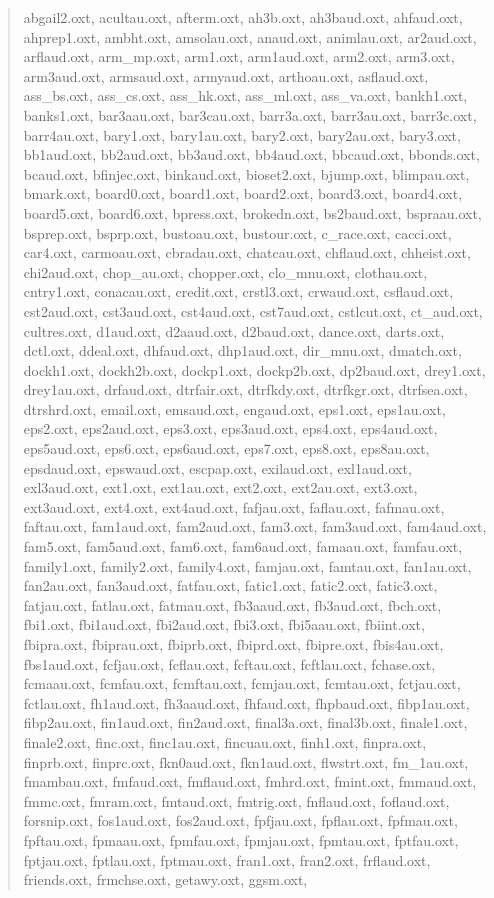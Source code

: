 \documentclass[]{scrartcl}
\begin{document}
\begin{quote}
   \ttfamily
   abgail2.oxt, acultau.oxt, afterm.oxt, ah3b.oxt, ah3baud.oxt, ahfaud.oxt, ahprep1.oxt, ambht.oxt, amsolau.oxt, anaud.oxt, animlau.oxt, ar2aud.oxt, arflaud.oxt, arm\_mp.oxt, arm1.oxt, arm1aud.oxt, arm2.oxt, arm3.oxt, arm3aud.oxt, armsaud.oxt, armyaud.oxt, arthoau.oxt, asflaud.oxt, ass\_bs.oxt, ass\_cs.oxt, ass\_hk.oxt, ass\_ml.oxt, ass\_va.oxt, bankh1.oxt, banks1.oxt, bar3aau.oxt, bar3cau.oxt, barr3a.oxt, barr3au.oxt, barr3c.oxt, barr4au.oxt, bary1.oxt, bary1au.oxt, bary2.oxt, bary2au.oxt, bary3.oxt, bb1aud.oxt, bb2aud.oxt, bb3aud.oxt, bb4aud.oxt, bbcaud.oxt, bbonds.oxt, bcaud.oxt, bfinjec.oxt, binkaud.oxt, bioset2.oxt, bjump.oxt, blimpau.oxt, bmark.oxt, board0.oxt, board1.oxt, board2.oxt, board3.oxt, board4.oxt, board5.oxt, board6.oxt, bpress.oxt, brokedn.oxt, bs2baud.oxt, bspraau.oxt, bsprep.oxt, bsprp.oxt, bustoau.oxt, bustour.oxt, c\_race.oxt, cacci.oxt, car4.oxt, carmoau.oxt, cbradau.oxt, chatcau.oxt, chflaud.oxt, chheist.oxt, chi2aud.oxt, chop\_au.oxt, chopper.oxt, clo\_mnu.oxt, clothau.oxt, cntry1.oxt, conacau.oxt, credit.oxt, crstl3.oxt, crwaud.oxt, csflaud.oxt, cst2aud.oxt, cst3aud.oxt, cst4aud.oxt, cst7aud.oxt, cstlcut.oxt, ct\_aud.oxt, cultres.oxt, d1aud.oxt, d2aaud.oxt, d2baud.oxt, dance.oxt, darts.oxt, dctl.oxt, ddeal.oxt, dhfaud.oxt, dhp1aud.oxt, dir\_mnu.oxt, dmatch.oxt, dockh1.oxt, dockh2b.oxt, dockp1.oxt, dockp2b.oxt, dp2baud.oxt, drey1.oxt, drey1au.oxt, drfaud.oxt, dtrfair.oxt, dtrfkdy.oxt, dtrfkgr.oxt, dtrfsea.oxt, dtrshrd.oxt, email.oxt, emsaud.oxt, engaud.oxt, eps1.oxt, eps1au.oxt, eps2.oxt, eps2aud.oxt, eps3.oxt, eps3aud.oxt, eps4.oxt, eps4aud.oxt, eps5aud.oxt, eps6.oxt, eps6aud.oxt, eps7.oxt, eps8.oxt, eps8au.oxt, epsdaud.oxt, epswaud.oxt, escpap.oxt, exilaud.oxt, exl1aud.oxt, exl3aud.oxt, ext1.oxt, ext1au.oxt, ext2.oxt, ext2au.oxt, ext3.oxt, ext3aud.oxt, ext4.oxt, ext4aud.oxt, fafjau.oxt, faflau.oxt, fafmau.oxt, faftau.oxt, fam1aud.oxt, fam2aud.oxt, fam3.oxt, fam3aud.oxt, fam4aud.oxt, fam5.oxt, fam5aud.oxt, fam6.oxt, fam6aud.oxt, famaau.oxt, famfau.oxt, family1.oxt, family2.oxt, family4.oxt, famjau.oxt, famtau.oxt, fan1au.oxt, fan2au.oxt, fan3aud.oxt, fatfau.oxt, fatic1.oxt, fatic2.oxt, fatic3.oxt, fatjau.oxt, fatlau.oxt, fatmau.oxt, fb3aaud.oxt, fb3aud.oxt, fbch.oxt, fbi1.oxt, fbi1aud.oxt, fbi2aud.oxt, fbi3.oxt, fbi5aau.oxt, fbiint.oxt, fbipra.oxt, fbiprau.oxt, fbiprb.oxt, fbiprd.oxt, fbipre.oxt, fbis4au.oxt, fbs1aud.oxt, fcfjau.oxt, fcflau.oxt, fcftau.oxt, fcftlau.oxt, fchase.oxt, fcmaau.oxt, fcmfau.oxt, fcmftau.oxt, fcmjau.oxt, fcmtau.oxt, fctjau.oxt, fctlau.oxt, fh1aud.oxt, fh3aaud.oxt, fhfaud.oxt, fhpbaud.oxt, fibp1au.oxt, fibp2au.oxt, fin1aud.oxt, fin2aud.oxt, final3a.oxt, final3b.oxt, finale1.oxt, finale2.oxt, finc.oxt, finc1au.oxt, fincuau.oxt, finh1.oxt, finpra.oxt, finprb.oxt, finprc.oxt, fkn0aud.oxt, fkn1aud.oxt, flwstrt.oxt, fm\_1au.oxt, fmambau.oxt, fmfaud.oxt, fmflaud.oxt, fmhrd.oxt, fmint.oxt, fmmaud.oxt, fmmc.oxt, fmram.oxt, fmtaud.oxt, fmtrig.oxt, fnflaud.oxt, foflaud.oxt, forsnip.oxt, fos1aud.oxt, fos2aud.oxt, fpfjau.oxt, fpflau.oxt, fpfmau.oxt, fpftau.oxt, fpmaau.oxt, fpmfau.oxt, fpmjau.oxt, fpmtau.oxt, fptfau.oxt, fptjau.oxt, fptlau.oxt, fptmau.oxt, fran1.oxt, fran2.oxt, frflaud.oxt, friends.oxt, frmchse.oxt, getawy.oxt, ggsm.oxt, 
\end{quote}
\end{document}
